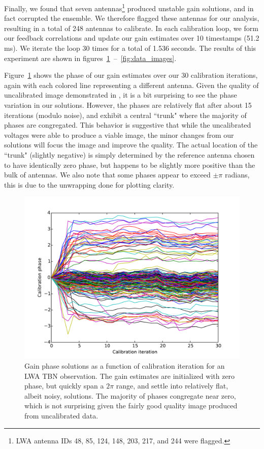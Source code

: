 \documentclass[a4paper,fleqn,usenatbib]{../mnras}
\begin{document}
Finally, we found that seven antennas\footnote{LWA antenna IDs 48, 85, 124, 148, 203, 217, and 244 were flagged.} produced unstable gain solutions, and in fact corrupted the ensemble. We therefore flagged these antennas for our analysis, resulting in a total of 248 antennas to calibrate. In each calibration loop, we form our feedback correlations and update our gain estimates over 10 timestamps (51.2 ms). We iterate the loop 30 times for a total of 1.536 seconds. The results of this experiment are shown in figures~\ref{fig:data_phase}~--~\ref{fig:data_images}.

Figure~\ref{fig:data_phase} shows the phase of our gain estimates over our 30 calibration iterations, again with each colored line representing a different antenna. Given the quality of uncalibrated image demonstrated in \cite{thy15c}, it is a bit surprising to see the phase variation in our solutions. However, the phases are relatively flat after about 15 iterations (modulo noise), and exhibit a central ``trunk" where the majority of phases are congregated. This behavior is suggestive that while the uncalibrated voltages were able to produce a viable image, the minor changes from our solutions will focus the image and improve the quality. The actual location of the ``trunk" (slightly negative) is simply determined by the reference antenna chosen to have identically zero phase, but happens to be slightly more positive than the bulk of antennas. We also note that some phases appear to exceed $\pm \pi$ radians, this is due to the unwrapping done for plotting clarity.

\begin{figure}
\begin{center}
\includegraphics[width=\columnwidth]{figures/cal_paper_data_phases.pdf}
\caption{Gain phase solutions as a function of calibration iteration for an LWA TBN observation. The gain estimates are initialized with zero phase, but quickly span a $2\pi$ range, and settle into relatively flat, albeit noisy, solutions. The majority of phases congregate near zero, which is not surprising given the fairly good quality image produced from uncalibrated data.
}
\label{fig:data_phase}
\end{center}
\end{figure}
\end{document}
